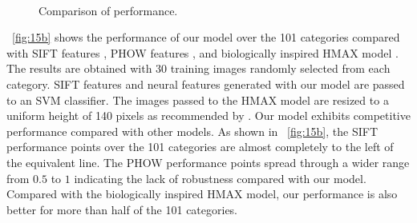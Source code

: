 \documentclass[5p]{elsarticle}
\begin{document}
\begin{figure}
\centering
  \\
\caption{Comparison of performance.}
\label{fig:15}
\end{figure}

\figurename~\ref{fig:15b} shows
the performance of our model over the 101 categories
compared with SIFT features \cite{lowe1999},
PHOW features \cite{lazebnik2006},
and biologically inspired HMAX model \cite{serre2007}.
The results are obtained with 30 training images randomly selected 
from each category.
SIFT features and neural features generated with our model
are passed to an SVM classifier.
The images passed to the HMAX model are resized 
to a uniform height of 140 pixels as recommended by \cite{serre2007}.
Our model exhibits competitive performance 
compared with other models.
As shown in \figurename~\ref{fig:15b},
the SIFT performance points over the 101 categories
are almost completely to the left of the equivalent line.
The PHOW performance points spread through 
a wider range from $0.5$ to $1$ indicating 
the lack of robustness compared with our model.
Compared with the biologically inspired HMAX model,
our performance is also better for more than half
of the 101 categories.
\end{document}
